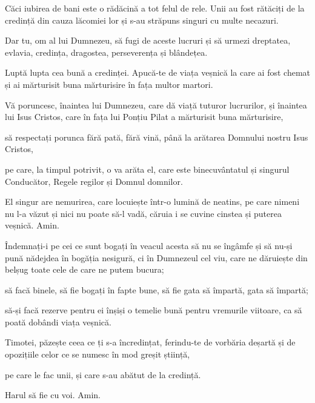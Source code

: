 {Căci iubirea de bani este o rădăcină a tot felul de rele. Unii au fost rătăciți de la credință din cauza lăcomiei lor și s-au străpuns singuri cu multe necazuri.


\par }{\PP {}Dar tu, om al lui Dumnezeu, să fugi de aceste lucruri și să urmezi dreptatea, evlavia, credința, dragostea, perseverența și blândețea.

Luptă lupta cea bună a credinței. Apucă-te de viața veșnică la care ai fost chemat și ai mărturisit buna mărturisire în fața multor martori.

Vă poruncesc, înaintea lui Dumnezeu, care dă viață tuturor lucrurilor, și înaintea lui Isus Cristos, care în fața lui Ponțiu Pilat a mărturisit buna mărturisire,

să respectați porunca fără pată, fără vină, până la arătarea Domnului nostru Isus Cristos,

pe care, la timpul potrivit, o va arăta el, care este binecuvântatul și singurul Conducător, Regele regilor și Domnul domnilor.

El singur are nemurirea, care locuiește într-o lumină de neatins, pe care nimeni nu l-a văzut și nici nu poate să-l vadă, căruia i se cuvine cinstea și puterea veșnică. Amin.


\par }{\PP {}Îndemnați-i pe cei ce sunt bogați în veacul acesta să nu se îngâmfe și să nu-și pună nădejdea în bogăția nesigură, ci în Dumnezeul cel viu, care ne dăruiește din belșug toate cele de care ne putem bucura;

să facă binele, să fie bogați în fapte bune, să fie gata să împartă, gata să împartă;

să-și facă rezerve pentru ei înșiși o temelie bună pentru vremurile viitoare, ca să poată dobândi viața veșnică.


\par }{\PP {}Timotei, păzește ceea ce ți s-a încredințat, ferindu-te de vorbăria deșartă și de opozițiile celor ce se numesc în mod greșit știință,

pe care le fac unii, și care s-au abătut de la credință.

\par }{\PP Harul să fie cu voi. Amin.


\par }